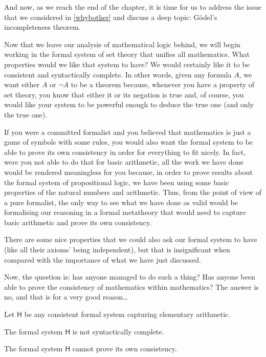 \begin{para}
And now, as we reach the end of the chapter, it is time for us to address the issue that we considered in \ref{whybother} and discuss a deep topic: G\"odel's incompleteness theorem.

Now that we leave our analysis of mathematical logic behind, we will begin working in the formal system of set theory that unifies all mathematics. What properties would we like that system to have?
We would certainly like it to be consistent and syntactically complete.
In other words, given any formula $A$, we want either $A$ or $\lnot A$ to be a theorem because, whenever you have a property of set theory, you know that either it or its negation is true and, of course, you would like your system to be powerful enough to deduce the true one (and only the true one).

If you were a committed formalist and you believed that mathematics is just a game of symbols with some rules, you would also want the formal system to be able to prove its own consistency in order for everything to fit nicely.
In fact, were you not able to do that for basic arithmetic, all the work we have done would be rendered meaningless for you because, in order to prove results about the formal system of propositional logic, we have been using some basic properties of the natural numbers and arithmetic.
Thus, from the point of view of a pure formalist, the only way to see what we have done as valid would be formalising our reasoning in a formal metatheory that would need to capture basic arithmetic and prove its own consistency.

There are some nice properties that we could also ask our formal system to have (like all their axioms' being independent), but that is insignificant when compared with the importance of what we have just discussed.

Now, the question is: has anyone managed to do such a thing? Has anyone been able to prove the consistency of mathematics within mathematics? The answer is no, and that is for a very good reason\ldots
\end{para}

\begin{theorem}
Let $\mathsf{H}$ be any consistent formal system capturing elementary arithmetic.
\begin{statements}
\item The formal system $\mathsf{H}$ is not syntactically complete.
\item The formal system $\mathsf{H}$ cannot prove its own consistency. 
\end{statements}
\label{<+label+>}
\end{theorem}


